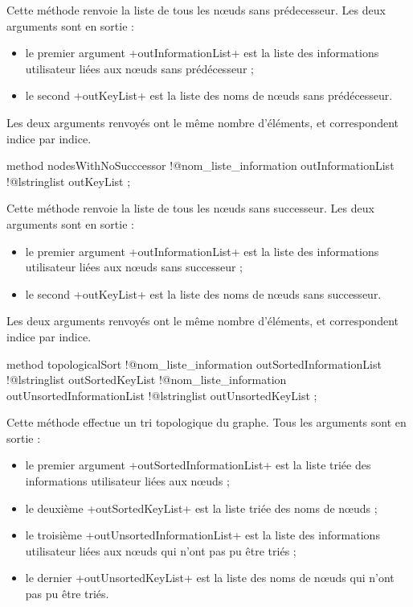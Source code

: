 Cette méthode renvoie la liste de tous les nœuds sans prédecesseur. Les deux arguments sont en sortie :
\begin{itemize}
  \item le premier argument \ggs+outInformationList+ est la liste des informations utilisateur liées aux nœuds sans prédécesseur ;
  \item le second \ggs+outKeyList+ est la liste des noms de nœuds sans prédécesseur.
\end{itemize}

Les deux arguments renvoyés ont le même nombre d'éléments, et correspondent indice par indice.







\begin{galgascode}
method nodesWithNoSucccessor
  !@nom_liste_information outInformationList
  !@lstringlist outKeyList
;
\end{galgascode}

Cette méthode renvoie la liste de tous les nœuds sans successeur. Les deux arguments sont en sortie :
\begin{itemize}
  \item le premier argument \ggs+outInformationList+ est la liste des informations utilisateur liées aux nœuds sans successeur ;
  \item le second \ggs+outKeyList+ est la liste des noms de nœuds sans successeur.
\end{itemize}

Les deux arguments renvoyés ont le même nombre d'éléments, et correspondent indice par indice.






\begin{galgascode}
method topologicalSort
  !@nom_liste_information outSortedInformationList
  !@lstringlist outSortedKeyList
  !@nom_liste_information outUnsortedInformationList
  !@lstringlist outUnsortedKeyList
;
\end{galgascode}

Cette méthode effectue un tri topologique du graphe. Tous les arguments sont en sortie :
\begin{itemize}
  \item le premier argument \ggs+outSortedInformationList+ est la liste triée des informations utilisateur liées aux nœuds ;
  \item le deuxième \ggs+outSortedKeyList+ est la liste triée des noms de nœuds ;
  \item le troisième \ggs+outUnsortedInformationList+ est la liste des informations utilisateur liées aux nœuds qui n'ont pas pu être triés ;
  \item le dernier \ggs+outUnsortedKeyList+ est la liste des noms de nœuds qui n'ont pas pu être triés.
\end{itemize}

